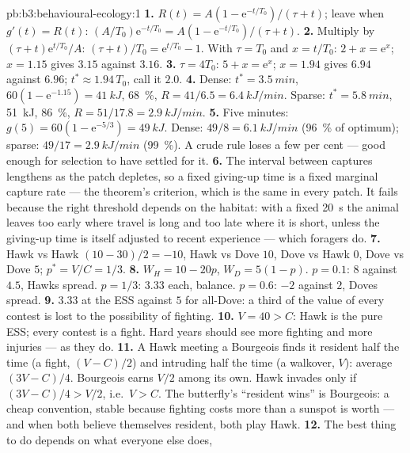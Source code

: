 \begin{solution}{pb:b3:behavioural-ecology:1}
\textbf{1.} $R(t) = A(1 - \mathrm{e}^{-t/T_{0}})/(\tau + t)$; leave when
$g'(t) = R(t)$: $(A/T_{0})\mathrm{e}^{-t/T_{0}} = A(1 - \mathrm{e}^{-t/T_{0}})/
(\tau + t)$.
\textbf{2.} Multiply by $(\tau + t)\mathrm{e}^{t/T_{0}}/A$: $(\tau + t)/T_{0}
= \mathrm{e}^{t/T_{0}} - 1$. With $\tau = T_{0}$ and $x = t/T_{0}$: $2 + x =
\mathrm{e}^{x}$; $x = 1.15$ gives $3.15$ against $3.16$.
\textbf{3.} $\tau = 4T_{0}$: $5 + x = \mathrm{e}^{x}$; $x = 1.94$ gives
$6.94$ against $6.96$; $t^{*} \approx 1.94\,T_{0}$, call it $2.0$.
\textbf{4.} Dense: $t^{*} = \qty{3.5}{min}$, $60(1 - \mathrm{e}^{-1.15}) =
\qty{41}{kJ}$, \qty{68}{\%}, $R = 41/6.5 = \qty{6.4}{kJ/min}$. Sparse:
$t^{*} = \qty{5.8}{min}$, \qty{51}{kJ}, \qty{86}{\%}, $R = 51/17.8 =
\qty{2.9}{kJ/min}$.
\textbf{5.} Five minutes: $g(5) = 60(1 - \mathrm{e}^{-5/3}) = \qty{49}{kJ}$.
Dense: $49/8 = \qty{6.1}{kJ/min}$ (\qty{96}{\%} of optimum); sparse:
$49/17 = \qty{2.9}{kJ/min}$ (\qty{99}{\%}). A crude rule loses a few per
cent --- good enough for selection to have settled for it.
\textbf{6.} The interval between captures lengthens as the patch
depletes, so a fixed giving-up time is a fixed marginal capture rate
--- the theorem's criterion, which is the same in every patch. It fails
because the right threshold depends on the habitat: with a fixed
\qty{20}{s} the animal leaves too early where travel is long and too
late where it is short, unless the giving-up time is itself adjusted
to recent experience --- which foragers do.
\textbf{7.} Hawk vs Hawk $(10 - 30)/2 = -10$, Hawk vs Dove $10$, Dove vs
Hawk $0$, Dove vs Dove $5$; $p^{*} = V/C = 1/3$.
\textbf{8.} $W_{H} = 10 - 20p$, $W_{D} = 5(1 - p)$. $p = 0.1$: $8$ against
$4.5$, Hawks spread. $p = 1/3$: $3.33$ each, balance. $p = 0.6$: $-2$
against $2$, Doves spread.
\textbf{9.} $3.33$ at the ESS against $5$ for all-Dove: a third of the
value of every contest is lost to the possibility of fighting.
\textbf{10.} $V = 40 > C$: Hawk is the pure ESS; every contest is a fight.
Hard years should see more fighting and more injuries --- as they do.
\textbf{11.} A Hawk meeting a Bourgeois finds it resident half the time
(a fight, $(V - C)/2$) and intruding half the time (a walkover, $V$):
average $(3V - C)/4$. Bourgeois earns $V/2$ among its own. Hawk invades
only if $(3V - C)/4 > V/2$, i.e.\ $V > C$. The butterfly's ``resident
wins'' is Bourgeois: a cheap convention, stable because fighting costs
more than a sunspot is worth --- and when both believe themselves
resident, both play Hawk.
\textbf{12.} The best thing to do depends on what everyone else does,

\end{solution}
